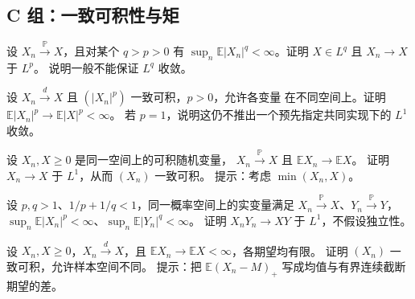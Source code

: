 \subsection*{C 组：一致可积性与矩}
\begin{enumerate}[label=\textbf{\thechapter.\arabic*.},resume]
设 $X_n\xrightarrow{\mathbb P}X$，且对某个 $q>p>0$ 有
$\sup_n\mathbb E|X_n|^q<\infty$。证明 $X\in L^q$ 且 $X_n\to X$ 于 $L^p$。
说明一般不能保证 $L^q$ 收敛。

设 $X_n\xrightarrow dX$ 且 $(|X_n|^p)$ 一致可积，$p>0$，允许各变量
在不同空间上。证明 $\mathbb E|X_n|^p\to\mathbb E|X|^p<\infty$。
若 $p=1$，说明这仍不推出一个预先指定共同实现下的 $L^1$ 收敛。

设 $X_n,X\ge0$ 是同一空间上的可积随机变量，
$X_n\xrightarrow{\mathbb P}X$ 且 $\mathbb E X_n\to\mathbb E X$。
证明 $X_n\to X$ 于 $L^1$，从而 $(X_n)$ 一致可积。
提示：考虑 $\min(X_n,X)$。

设 $p,q>1$、$1/p+1/q<1$，同一概率空间上的实变量满足
$X_n\xrightarrow{\mathbb P}X$、$Y_n\xrightarrow{\mathbb P}Y$，
$\sup_n\mathbb E|X_n|^p<\infty$、$\sup_n\mathbb E|Y_n|^q<\infty$。
证明 $X_nY_n\to XY$ 于 $L^1$，不假设独立性。

设 $X_n,X\ge0$，$X_n\xrightarrow dX$，且
$\mathbb E X_n\to\mathbb E X<\infty$，各期望均有限。
证明 $(X_n)$ 一致可积，允许样本空间不同。
提示：把 $\mathbb E(X_n-M)_+$ 写成均值与有界连续截断期望的差。
\end{enumerate}
